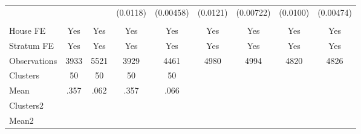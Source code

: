 {\begin{tabular}{l*{8}{c}}
                &         &         & (0.0118)&(0.00458)& (0.0121)&(0.00722)& (0.0100)&(0.00474)\\
                &         &         &         &         &         &         &         &         \\
House FE        &      Yes&      Yes&      Yes&      Yes&      Yes&      Yes&      Yes&      Yes\\
Stratum FE      &      Yes&      Yes&      Yes&      Yes&      Yes&      Yes&      Yes&      Yes\\
\midrule
Observations    &     3933&     5521&     3929&     4461&     4980&     4994&     4820&     4826\\
Clusters        &       50&       50&       50&       50&         &         &         &         \\
Mean            &     .357&     .062&     .357&     .066&         &         &         &         \\
Clusters2       &         &         &         &         &         &         &         &         \\
Mean2           &         &         &         &         &         &         &         &         \\
\bottomrule
\end{tabular}
}
